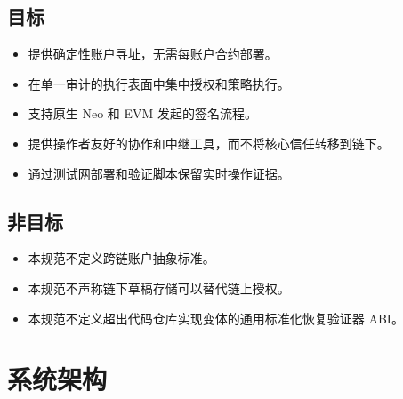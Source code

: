 \documentclass[11pt]{article}
\begin{document}
\subsection*{目标}
\begin{itemize}
  \item 提供确定性账户寻址，无需每账户合约部署。
  \item 在单一审计的执行表面中集中授权和策略执行。
  \item 支持原生 Neo 和 EVM 发起的签名流程。
  \item 提供操作者友好的协作和中继工具，而不将核心信任转移到链下。
  \item 通过测试网部署和验证脚本保留实时操作证据。
\end{itemize}

\subsection*{非目标}
\begin{itemize}
  \item 本规范不定义跨链账户抽象标准。
  \item 本规范不声称链下草稿存储可以替代链上授权。
  \item 本规范不定义超出代码仓库实现变体的通用标准化恢复验证器 ABI。
\end{itemize}

\section{系统架构}
\end{document}
